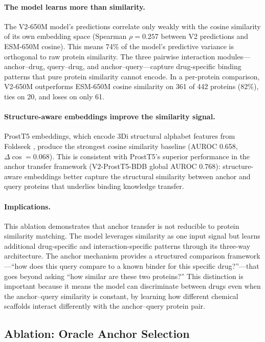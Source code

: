 \paragraph{The model learns more than similarity.}
The V2-650M model's predictions correlate only weakly with the cosine similarity of its own embedding space (Spearman $\rho = 0.257$ between V2 predictions and ESM-650M cosine). This means 74\% of the model's predictive variance is orthogonal to raw protein similarity. The three pairwise interaction modules---anchor--drug, query--drug, and anchor--query---capture drug-specific binding patterns that pure protein similarity cannot encode. In a per-protein comparison, V2-650M outperforms ESM-650M cosine similarity on 361 of 442 proteins (82\%), ties on 20, and loses on only 61.

\paragraph{Structure-aware embeddings improve the similarity signal.}
ProstT5 embeddings, which encode 3Di structural alphabet features from Foldseek \cite{van2024fast}, produce the strongest cosine similarity baseline (AUROC 0.658, $\Delta\cos = 0.068$). This is consistent with ProstT5's superior performance in the anchor transfer framework (V2-ProstT5-BDB global AUROC 0.768): structure-aware embeddings better capture the structural similarity between anchor and query proteins that underlies binding knowledge transfer.

\paragraph{Implications.}
This ablation demonstrates that anchor transfer is not reducible to protein similarity matching. The model leverages similarity as one input signal but learns additional drug-specific and interaction-specific patterns through its three-way architecture. The anchor mechanism provides a structured comparison framework---``how does this query compare to a known binder for this specific drug?''---that goes beyond asking ``how similar are these two proteins?'' This distinction is important because it means the model can discriminate between drugs even when the anchor--query similarity is constant, by learning how different chemical scaffolds interact differently with the anchor--query protein pair.

\subsection{Ablation: Oracle Anchor Selection}
\label{sec:oracle_anchors}

